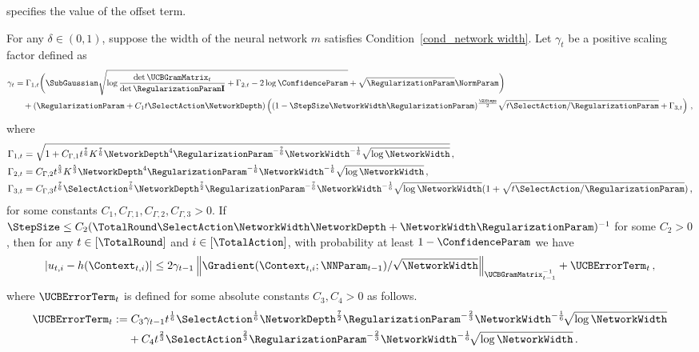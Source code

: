 \documentclass{article}
\theoremstyle{plain}
\begin{document}
specifies the value of the offset term.
%
\begin{lemma} \label{lemma_u'_modified UCB}
For any $\delta \in (0,1)$, suppose the width of the neural network $m$ satisfies Condition~\ref{cond_network width}.
Let $\gamma_t$ be a positive scaling factor defined as
%
    \begin{equation*} \label{eq:gamma t}
        \begin{split}
            \gamma_{t} &=
             \Gamma_{1,t} \bigg( \SubGaussian \sqrt{ \log \frac{ \det \UCBGramMatrix_t}{\det \RegularizationParam \mathbf{I}} + \Gamma_{2,t} -2 \log \ConfidenceParam} + \sqrt{\RegularizationParam} \NormParam \bigg)
            \\
            &\quad + (\RegularizationParam + C_1 t \SelectAction \NetworkDepth) \left( (1-\StepSize \NetworkWidth \RegularizationParam)^{\frac{\GDSteps}{2}} \sqrt{t \SelectAction/\RegularizationParam} + \Gamma_{3,t} \right) \, , 
        \end{split}
    \end{equation*}
%
where
%
    \begin{align*}
        & \Gamma_{1,t} = \sqrt{1+C_{\Gamma,1} t^{\frac{7}{6}} K^{\frac{7}{6}} \NetworkDepth^4 \RegularizationParam^{-\frac{7}{6}} \NetworkWidth^{-\frac{1}{6}} \sqrt{\log \NetworkWidth}} \, ,
        \\
        & \Gamma_{2,t} = C_{\Gamma, 2} t^{\frac{5}{3}} K^{\frac{5}{3}} \NetworkDepth^4 \RegularizationParam^{-\frac{1}{6}} \NetworkWidth^{-\frac{1}{6}} \sqrt{\log \NetworkWidth} \, ,
        \\
        & \Gamma_{3,t} = C_{\Gamma, 3} t^{\frac{7}{6}} \SelectAction^{\frac{7}{6}} \NetworkDepth^{\frac{7}{2}} \RegularizationParam^{-\frac{7}{6}} \NetworkWidth^{-\frac{1}{6}} \sqrt{\log \NetworkWidth} (1+\sqrt{t \SelectAction / \RegularizationParam}) \, ,
    \end{align*}
%
for some constants $C_1, C_{\Gamma, 1}, C_{\Gamma,2}, C_{\Gamma,3} > 0$.
If $\StepSize \le C_2( \TotalRound \SelectAction \NetworkWidth \NetworkDepth + \NetworkWidth \RegularizationParam)^{-1}$ for some $C_2 > 0$,
then for any $t \in [\TotalRound]$ and $i \in [\TotalAction]$, with probability at least $1-\ConfidenceParam$ we have
%
    \begin{equation*}
         |u_{t, i} - h(\Context_{t,i})|  \le 2 \gamma_{t-1} \left\| \Gradient(\Context_{t,i}; \NNParam_{t-1}) /  \sqrt{\NetworkWidth} \right\|_{\UCBGramMatrix_{t-1}^{-1}} + \UCBErrorTerm_t \, ,
    \end{equation*}
%
where $\UCBErrorTerm_t $ is defined for some absolute constants $C_3, C_4  > 0 $ as follows.
%
    \begin{align*}
        \UCBErrorTerm_t 
        &:= C_3 \gamma_{t-1}  t^{\frac{1}{6}} \SelectAction^{\frac{1}{6}} \NetworkDepth^{\frac{7}{2}} \RegularizationParam^{-\frac{2}{3}}   \NetworkWidth^{-\frac{1}{6}}\! \sqrt{ \log \NetworkWidth } 
        \\
        & \phantom{{}={}} + C_4 t^{\frac{2}{3}} \SelectAction^{\frac{2}{3}} \RegularizationParam^{-\frac{2}{3}} \NetworkWidth^{-\frac{1}{6}}\! \sqrt{ \log \NetworkWidth } \,.
    \end{align*}
\end{lemma}
\end{document}
